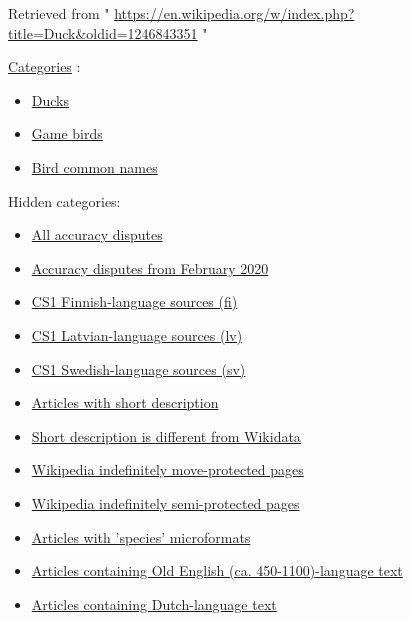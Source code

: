 \documentclass[11pt,a4paper]{article}
\begin{document}
Retrieved from " \href{https://en.wikipedia.org/w/index.php?title=Duck\&oldid=1246843351}{https://en.wikipedia.org/w/index.php?title=Duck\&oldid=1246843351} "

\href{/wiki/Help:Category}{Categories} :

\begin{itemize}
\item \href{/wiki/Category:Ducks}{Ducks}
\item \href{/wiki/Category:Game\_birds}{Game birds}
\item \href{/wiki/Category:Bird\_common\_names}{Bird common names}
\end{itemize}

Hidden categories:

\begin{itemize}
\item \href{/wiki/Category:All\_accuracy\_disputes}{All accuracy disputes}
\item \href{/wiki/Category:Accuracy\_disputes\_from\_February\_2020}{Accuracy disputes from February 2020}
\item \href{/wiki/Category:CS1\_Finnish-language\_sources\_(fi)}{CS1 Finnish-language sources (fi)}
\item \href{/wiki/Category:CS1\_Latvian-language\_sources\_(lv)}{CS1 Latvian-language sources (lv)}
\item \href{/wiki/Category:CS1\_Swedish-language\_sources\_(sv)}{CS1 Swedish-language sources (sv)}
\item \href{/wiki/Category:Articles\_with\_short\_description}{Articles with short description}
\item \href{/wiki/Category:Short\_description\_is\_different\_from\_Wikidata}{Short description is different from Wikidata}
\item \href{/wiki/Category:Wikipedia\_indefinitely\_move-protected\_pages}{Wikipedia indefinitely move-protected pages}
\item \href{/wiki/Category:Wikipedia\_indefinitely\_semi-protected\_pages}{Wikipedia indefinitely semi-protected pages}
\item \href{/wiki/Category:Articles\_with\_\%27species\%27\_microformats}{Articles with 'species' microformats}
\item \href{/wiki/Category:Articles\_containing\_Old\_English\_(ca.\_450-1100)-language\_text}{Articles containing Old English (ca. 450-1100)-language text}
\item \href{/wiki/Category:Articles\_containing\_Dutch-language\_text}{Articles containing Dutch-language text}

\end{itemize}
\end{document}
